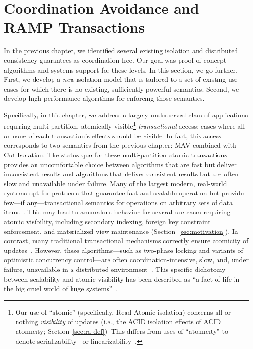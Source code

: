 
\chapter{Coordination Avoidance and RAMP Transactions}
\label{c.ramp}

In the previous chapter, we identified several existing isolation and
distributed consistency guarantees as coordination-free. Our goal was
proof-of-concept algorithms and systems support for these levels. In
this section, we go further. First, we develop a \textit{new} isolation
model that is tailored to a set of existing use cases for which there
is no existing, sufficiently powerful \iconfluent semantics. Second,
we develop high performance algorithms for enforcing those
semantics. 

Specifically, in this chapter, we address a largely underserved class
of applications requiring multi-partition, atomically
visible\footnote{\label{atomicnote}Our use of ``atomic''
  (specifically, Read Atomic isolation) concerns all-or-nothing
  \textit{visibility} of updates (i.e., the ACID isolation effects of
  ACID atomicity; Section~\ref{sec:ra-def}). This differs from uses of
  ``atomicity'' to denote serializability~\cite{bernstein-book} or
  linearizability~\cite{dcomp-book}.}  \textit{transactional} access:
cases where all or none of each transaction's effects should be
visible. In fact, this access corresponds to two semantics from the
previous chapter: MAV combined with Cut Isolation. The status quo for
these multi-partition atomic transactions provides an uncomfortable
choice between algorithms that are fast but deliver inconsistent
results and algorithms that deliver consistent results but are often
slow and unavailable under failure. Many of the largest modern,
real-world systems opt for protocols that guarantee fast and scalable
operation but provide few---if any---transactional semantics for
operations on arbitrary sets of data
items~\cite{tao,bigtable,pnuts,dynamo,2pc-scalability,espresso,rainbird}. This
may lead to anomalous behavior for several use cases requiring atomic
visibility, including secondary indexing, foreign key constraint
enforcement, and materialized view maintenance
(Section~\ref{sec:motivation}). In contrast, many traditional
transactional mechanisms correctly ensure atomicity of
updates~\cite{bernstein-book,spanner,calvin}. However, these
algorithms---such as two-phase locking and variants of optimistic
concurrency control---are often coordination-intensive, slow, and,
under failure, unavailable in a distributed
environment~\cite{hat-vldb,schism,jones-dtxn,pavlo-partition}. This
specific dichotomy between scalability and atomic visibility has been
described as ``a fact of life in the big cruel world of huge
systems''~\cite{helland-trans}.

